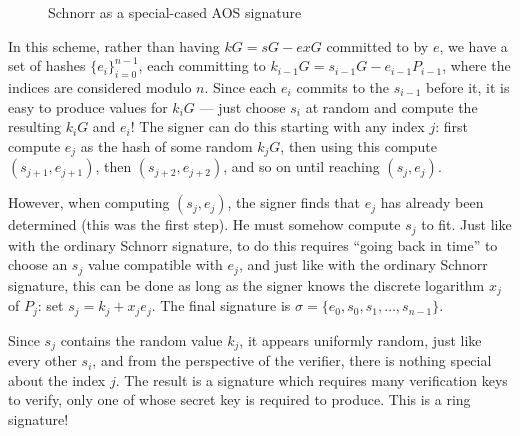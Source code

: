 \documentclass[letterpaper]{article}
\begin{document}
\begin{figure}\label{fig1}
\begin{center}
\end{center}
\caption{Schnorr as a special-cased AOS signature}
\end{figure}

In this scheme, rather than having $kG = sG - exG$ committed to by $e$, we
have a set of hashes $\{e_i\}_{i=0}^{n-1}$, each committing to $k_{i-1}G = s_{i-1}G
- e_{i-1}P_{i-1}$, where the indices are considered modulo $n$. Since each $e_i$ commits
to the $s_{i-1}$ before it, it is easy to produce values for $k_iG$ --- just
choose $s_i$ at random and compute the resulting $k_iG$ and $e_i$! The signer can
do this starting with any index $j$: first compute $e_j$ as the hash of some
random $k_jG$, then using this compute $(s_{j+1}, e_{j+1})$, then $(s_{j+2}, e_{j+2})$,
and so on until reaching $(s_j, e_j)$.

However, when computing $(s_j, e_j)$, the signer finds that $e_j$ has already
been determined (this was the first step). He must somehow compute $s_j$
to fit. Just like with the ordinary Schnorr signature, to do this requires ``going
back in time'' to choose an $s_j$ value compatible with $e_j$, and just
like with the ordinary Schnorr signature, this can be done as long as the signer
knows the discrete logarithm $x_j$ of $P_j$: set $s_j = k_j + x_je_j$. The
final signature is $\sigma = \{ e_0, s_0, s_1, \ldots, s_{n-1} \}$.

Since $s_j$ contains the random value $k_j$, it appears uniformly random, just
like every other $s_i$, and from the perspective of the verifier, there is nothing
special about the index $j$. The result is a signature which requires many verification
keys to verify, only one of whose secret key is required to produce. This is a ring
signature!
\end{document}
